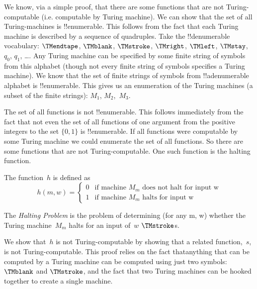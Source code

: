 \documentclass[../../include/open-logic-section]{subfiles}
\begin{document}

\begin{explain}
We know, via a simple proof, that there are some functions that are not
Turing-computable (i.e. computable by Turing machine).
We can show that the set of all Turing-machines is !!{enumerable}. This
follows from the fact that each Turing machine is described by a sequence
of quadruples. Take the !!{denumerable} vocabulary: $\TMendtape$,
$\TMblank$, $\TMstroke$, $\TMright$, $\TMleft$, $\TMstay$, $q_0$,
$q_1$, \dots. Any Turing machine
can be specified by some finite string of symbols from this alphabet
(though not every finite string of symbols specifies a Turing machine). We
know that the set of finite strings of symbols from !!a{denumerable}
alphabet is !!{enumerable}. This gives us an enumeration of the Turing
machines (a subset of the finite strings): $M_1$, $M_2$,~$M_3$.

The set of all functions is not !!{enumerable}. This follows immediately from
the fact that not even the set of all functions of one argument from the
positive integers to the set $\{0,1\}$ is !!{enumerable}.
If all functions were computable by some Turing machine we could enumerate
the set of all functions. So there are some functions that are not
Turing-computable. One such function is the halting function.
\end{explain}

\begin{defn} The function~$h$ is defined as
\[
h(m,w) =
\begin{cases}
  \text{0} & \text{if machine~$M_m$ does not halt for input w} \\
  \text{1} & \text{if machine~$M_m$ halts for input w}
\end{cases}
\]
\end{defn}

\begin{defn}
The \emph{Halting Problem} is the problem of determining (for any m, w)
whether the Turing machine~$M_m$ halts for an input of~$w$ $\TMstroke$s.
\end{defn}

\begin{explain}
We show that~$h$ is not Turing-computable by showing that a related
function,~$s$, is not Turing-computable. This proof relies on the fact
thatanything that can be computed by a Turing machine can be computed
using just two symbols: $\TMblank$ and $\TMstroke$, and the fact that two
Turing machines can be hooked together to create a single machine.
\end{explain}
\end{document}
